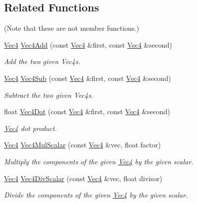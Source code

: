 \subsection*{Related Functions}
(Note that these are not member functions.) {\bf }\par
\begin{DoxyCompactItemize}
\item 
\hyperlink{classgfxmath_1_1_vec4}{Vec4} \hyperlink{classgfxmath_1_1_vec4_a8812efd4565ada77e6dab63828ad715b}{Vec4\+Add} (const \hyperlink{classgfxmath_1_1_vec4}{Vec4} \&first, const \hyperlink{classgfxmath_1_1_vec4}{Vec4} \&second)
\begin{DoxyCompactList}\small\item\em Add the two given Vec4s. \end{DoxyCompactList}\item 
\hyperlink{classgfxmath_1_1_vec4}{Vec4} \hyperlink{classgfxmath_1_1_vec4_a01968b83532d01613a8f89659d4a52dc}{Vec4\+Sub} (const \hyperlink{classgfxmath_1_1_vec4}{Vec4} \&first, const \hyperlink{classgfxmath_1_1_vec4}{Vec4} \&second)
\begin{DoxyCompactList}\small\item\em Subtract the two given Vec4s. \end{DoxyCompactList}\item 
float \hyperlink{classgfxmath_1_1_vec4_a2deb01c8dd6f1a06c0a0cfc2e96e9c1e}{Vec4\+Dot} (const \hyperlink{classgfxmath_1_1_vec4}{Vec4} \&first, const \hyperlink{classgfxmath_1_1_vec4}{Vec4} \&second)
\begin{DoxyCompactList}\small\item\em \hyperlink{classgfxmath_1_1_vec4}{Vec4} dot product. \end{DoxyCompactList}\item 
\hyperlink{classgfxmath_1_1_vec4}{Vec4} \hyperlink{classgfxmath_1_1_vec4_a70441f2888f0df752fe0624a5a7b362d}{Vec4\+Mul\+Scalar} (const \hyperlink{classgfxmath_1_1_vec4}{Vec4} \&vec, float factor)
\begin{DoxyCompactList}\small\item\em Multiply the components of the given \hyperlink{classgfxmath_1_1_vec4}{Vec4} by the given scalar. \end{DoxyCompactList}\item 
\hyperlink{classgfxmath_1_1_vec4}{Vec4} \hyperlink{classgfxmath_1_1_vec4_a670f1f6ebdadeaa2f656f153218fdee8}{Vec4\+Div\+Scalar} (const \hyperlink{classgfxmath_1_1_vec4}{Vec4} \&vec, float divisor)
\begin{DoxyCompactList}\small\item\em Divide the components of the given \hyperlink{classgfxmath_1_1_vec4}{Vec4} by the given scalar. \end{DoxyCompactList}\item 

\end{DoxyCompactItemize}
